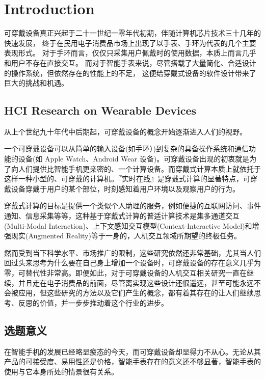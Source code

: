 \chapter{Introduction}

\quad\quad 可穿戴设备真正兴起于二十一世纪一零年代初期，伴随计算机芯片技术三十几年的快速发展，
终于在民用电子消费品市场上出现了以手表、手环为代表的几个主要表现形式。
对于手环而言，仅仅只采集用户佩戴时的使用数据，本质上而言几乎和用户不存在直接交互。
而对于智能手表来说，尽管搭载了大量简化、合适设计的操作系统，但依然存在的性能上的不足，
这便给穿戴式设备的软件设计带来了巨大的挑战和机遇\cite{DBLP:journals/corr/JiangCZZKZ15}。

\section{HCI Research on Wearable Devices}

从上个世纪九十年代中后期起，可穿戴设备的概念开始逐渐进入人们的视野。

一个可穿戴设备可以从简单的输入设备(如手环）)到复杂的具备操作系统和通信功能的设备(如 Apple Watch、Android Wear 设备)。可穿戴设备出现的初衷就是为了向人们提供比智能手机更亲密的、一个计算设备。而穿戴式计算本质上就依托于这样一种小型的、可穿戴的计算机。『实时在线』是穿戴式计算的显著特点，可穿戴设备穿戴于用户的某个部位，时刻感知着用户环境以及观察用户的行为。

穿戴式计算的目标是提供一个类似个人助理的服务，例如便捷的互联网访问、事件通知、信息采集等等，这种基于穿戴式计算的普适计算技术是集多通道交互(Multi-Modal Interaction)、上下文感知交互模型(Context-Interactive Model)和增强现实(Augmented Reality)等于一身的，人机交互领域所期望的终极任务\cite{dongshihai2004,yuweining2004}。

然而受到当下科学水平、市场推广的限制，这些研究依然还非常基础，尤其当人们回过头来思考为什么要在自己身上增加一个设备时，可穿戴设备的存在意义几乎为零，可替代性非常高。即便如此，对于可穿戴设备的人机交互相关研究一直在继续，并且走在电子消费品的前面，尽管离实现这些设计还很遥远，甚至可能永远不会被应用，但这些研究的方法以及它们产生的概念，都有着其存在的让人们继续思考、反思的价值\cite{hudson2014concepts}，并一步步推动着这个行业的进步。

\section{选题意义}

在智能手机的发展已经略显疲态的今天，而可穿戴设备却显得力不从心。无论从其产品的可接受度、易用性还是价格，智能手表存在的意义还不够显著，智能手表的使用与它本身所处的情景很有关系\cite{zhuzijian2015}。

